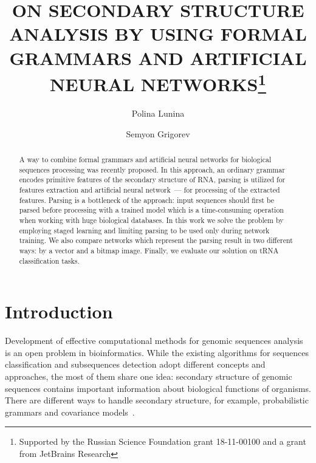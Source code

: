 \documentclass[runningheads]{llncs}
\begin{document}
%
\title{ON SECONDARY STRUCTURE ANALYSIS BY USING FORMAL GRAMMARS AND ARTIFICIAL NEURAL NETWORKS\thanks{Supported by the Russian Science Foundation grant 18-11-00100 and a grant from JetBrains Research}}
%
%
\author{Polina Lunina \and
Semyon Grigorev}
%
%
%
\maketitle              %
%
\begin{abstract}
A way to combine formal grammars and artificial neural networks for biological sequences processing was recently proposed.
In this approach, an ordinary grammar encodes primitive features of the secondary structure of RNA, parsing is utilized for features extraction and artificial neural network~--- for processing of the extracted features.
Parsing is a bottleneck of the approach: input sequences should first be parsed before processing with a trained model which is a time-consuming operation when working with huge biological databases.
In this work we solve the problem by employing staged learning and limiting parsing to be used only during network training.
We also compare networks which represent the parsing result in two different ways: by a vector and a bitmap image.
Finally, we evaluate our solution on tRNA classification tasks.

\end{abstract}
%
%
%
\section{Introduction}
Development of effective computational methods for genomic sequences analysis is an open problem in bioinformatics.
While the existing algorithms for sequences classification and subsequences detection adopt different concepts and approaches, the most of them share one idea: secondary structure of genomic sequences contains important information about biological functions of organisms.
There are different ways to handle secondary structure, for example, probabilistic grammars and covariance models~\cite{EddyDurbin,dowell2004evaluation,knudsen1999rna}.
\end{document}
